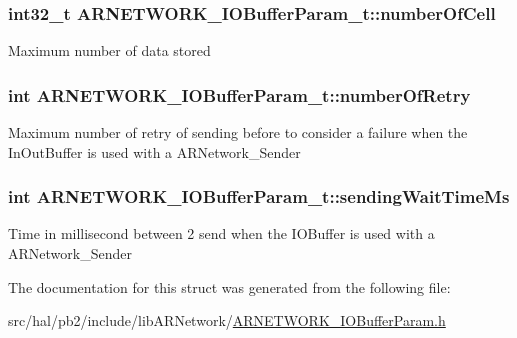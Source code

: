 \subsubsection[{\texorpdfstring{number\+Of\+Cell}{numberOfCell}}]{\setlength{\rightskip}{0pt plus 5cm}int32\+\_\+t A\+R\+N\+E\+T\+W\+O\+R\+K\+\_\+\+I\+O\+Buffer\+Param\+\_\+t\+::number\+Of\+Cell}\hypertarget{struct_a_r_n_e_t_w_o_r_k___i_o_buffer_param__t_aa4cee3d931cbae916e7b0f71d60fe6ba}{}\label{struct_a_r_n_e_t_w_o_r_k___i_o_buffer_param__t_aa4cee3d931cbae916e7b0f71d60fe6ba}
Maximum number of data stored 
\subsubsection[{\texorpdfstring{number\+Of\+Retry}{numberOfRetry}}]{\setlength{\rightskip}{0pt plus 5cm}int A\+R\+N\+E\+T\+W\+O\+R\+K\+\_\+\+I\+O\+Buffer\+Param\+\_\+t\+::number\+Of\+Retry}\hypertarget{struct_a_r_n_e_t_w_o_r_k___i_o_buffer_param__t_a74823dab6716f0216fe44f927584d968}{}\label{struct_a_r_n_e_t_w_o_r_k___i_o_buffer_param__t_a74823dab6716f0216fe44f927584d968}
Maximum number of retry of sending before to consider a failure when the In\+Out\+Buffer is used with a A\+R\+Network\+\_\+\+Sender 
\subsubsection[{\texorpdfstring{sending\+Wait\+Time\+Ms}{sendingWaitTimeMs}}]{\setlength{\rightskip}{0pt plus 5cm}int A\+R\+N\+E\+T\+W\+O\+R\+K\+\_\+\+I\+O\+Buffer\+Param\+\_\+t\+::sending\+Wait\+Time\+Ms}\hypertarget{struct_a_r_n_e_t_w_o_r_k___i_o_buffer_param__t_a4d4a2b5f38f2386ad05649defba5cc71}{}\label{struct_a_r_n_e_t_w_o_r_k___i_o_buffer_param__t_a4d4a2b5f38f2386ad05649defba5cc71}
Time in millisecond between 2 send when the I\+O\+Buffer is used with a A\+R\+Network\+\_\+\+Sender 

The documentation for this struct was generated from the following file\+:\begin{DoxyCompactItemize}
\item 
src/hal/pb2/include/lib\+A\+R\+Network/\hyperlink{_a_r_n_e_t_w_o_r_k___i_o_buffer_param_8h}{A\+R\+N\+E\+T\+W\+O\+R\+K\+\_\+\+I\+O\+Buffer\+Param.\+h}\end{DoxyCompactItemize}
